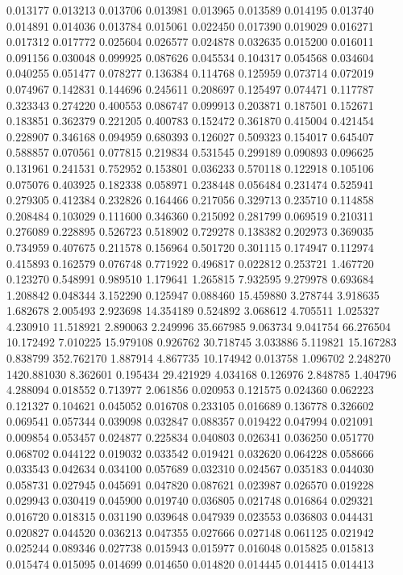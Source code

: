0.013177
0.013213
0.013706
0.013981
0.013965
0.013589
0.014195
0.013740
0.014891
0.014036
0.013784
0.015061
0.022450
0.017390
0.019029
0.016271
0.017312
0.017772
0.025604
0.026577
0.024878
0.032635
0.015200
0.016011
0.091156
0.030048
0.099925
0.087626
0.045534
0.104317
0.054568
0.034604
0.040255
0.051477
0.078277
0.136384
0.114768
0.125959
0.073714
0.072019
0.074967
0.142831
0.144696
0.245611
0.208697
0.125497
0.074471
0.117787
0.323343
0.274220
0.400553
0.086747
0.099913
0.203871
0.187501
0.152671
0.183851
0.362379
0.221205
0.400783
0.152472
0.361870
0.415004
0.421454
0.228907
0.346168
0.094959
0.680393
0.126027
0.509323
0.154017
0.645407
0.588857
0.070561
0.077815
0.219834
0.531545
0.299189
0.090893
0.096625
0.131961
0.241531
0.752952
0.153801
0.036233
0.570118
0.122918
0.105106
0.075076
0.403925
0.182338
0.058971
0.238448
0.056484
0.231474
0.525941
0.279305
0.412384
0.232826
0.164466
0.217056
0.329713
0.235710
0.114858
0.208484
0.103029
0.111600
0.346360
0.215092
0.281799
0.069519
0.210311
0.276089
0.228895
0.526723
0.518902
0.729278
0.138382
0.202973
0.369035
0.734959
0.407675
0.211578
0.156964
0.501720
0.301115
0.174947
0.112974
0.415893
0.162579
0.076748
0.771922
0.496817
0.022812
0.253721
1.467720
0.123270
0.548991
0.989510
1.179641
1.265815
7.932595
9.279978
0.693684
1.208842
0.048344
3.152290
0.125947
0.088460
15.459880
3.278744
3.918635
1.682678
2.005493
2.923698
14.354189
0.524892
3.068612
4.705511
1.025327
4.230910
11.518921
2.890063
2.249996
35.667985
9.063734
9.041754
66.276504
10.172492
7.010225
15.979108
0.926762
30.718745
3.033886
5.119821
15.167283
0.838799
352.762170
1.887914
4.867735
10.174942
0.013758
1.096702
2.248270
1420.881030
8.362601
0.195434
29.421929
4.034168
0.126976
2.848785
1.404796
4.288094
0.018552
0.713977
2.061856
0.020953
0.121575
0.024360
0.062223
0.121327
0.104621
0.045052
0.016708
0.233105
0.016689
0.136778
0.326602
0.069541
0.057344
0.039098
0.032847
0.088357
0.019422
0.047994
0.021091
0.009854
0.053457
0.024877
0.225834
0.040803
0.026341
0.036250
0.051770
0.068702
0.044122
0.019032
0.033542
0.019421
0.032620
0.064228
0.058666
0.033543
0.042634
0.034100
0.057689
0.032310
0.024567
0.035183
0.044030
0.058731
0.027945
0.045691
0.047820
0.087621
0.023987
0.026570
0.019228
0.029943
0.030419
0.045900
0.019740
0.036805
0.021748
0.016864
0.029321
0.016720
0.018315
0.031190
0.039648
0.047939
0.023553
0.036803
0.044431
0.020827
0.044520
0.036213
0.047355
0.027666
0.027148
0.061125
0.021942
0.025244
0.089346
0.027738
0.015943
0.015977
0.016048
0.015825
0.015813
0.015474
0.015095
0.014699
0.014650
0.014820
0.014445
0.014415
0.014413
